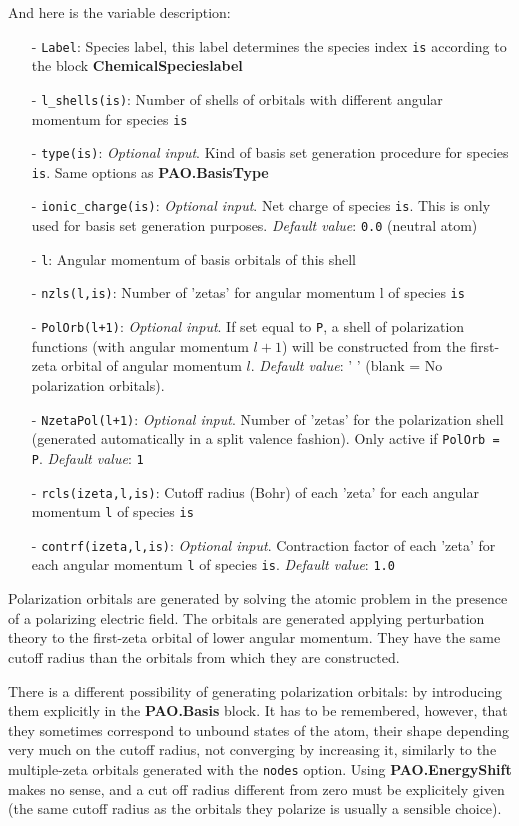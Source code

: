 \begin{description}
\noindent
And here is the variable description:
\begin{itemize}
\item[-] {\tt Label}: Species label, this label determines 
the species index {\tt is} according to the block {\bf ChemicalSpecieslabel}
\item[-] {\tt l\_shells(is)}: Number of shells of orbitals 
with different angular momentum for species {\tt is}  
\item[-] {\tt type(is)}: {\it Optional input}.
Kind of basis set generation procedure for species {\tt is}. 
Same options as {\bf PAO.BasisType}
\item[-] {\tt ionic\_charge(is)}: {\it Optional input}. 
Net charge of species {\tt is}. This is  only used for
basis set generation purposes. {\it Default value}: {\tt 0.0} (neutral atom)
\item[-] {\tt l}: Angular momentum of 
basis orbitals of this shell
\item[-] {\tt nzls(l,is)}: Number of 'zetas' for angular 
momentum l of species {\tt is}
\item[-] {\tt PolOrb(l+1)}: {\it Optional input}. If set equal to {\tt P}, a 
shell of  
polarization functions (with angular momentum $l+1$)  will be constructed 
from the first-zeta orbital of angular momentum $l$. {\it Default value}: ' ' 
(blank = No polarization orbitals). 
\item[-] {\tt NzetaPol(l+1)}: {\it Optional input}. Number of
'zetas' for the 
polarization shell (generated automatically in a split valence fashion). 
Only active if {\tt PolOrb = P}. {\it Default value}: {\tt 1} 
\item[-] {\tt rcls(izeta,l,is)}: Cutoff radius (Bohr) of 
each 'zeta' for each angular momentum {\tt l} of species {\tt is}
\item[-] {\tt contrf(izeta,l,is)}: {\it Optional input}. 
Contraction factor of 
each 'zeta' for each angular momentum {\tt l} of species {\tt is}.
{\it Default value}: {\tt 1.0}
\end{itemize} 

Polarization orbitals 
are generated by solving the atomic problem in the presence of a 
polarizing electric field. The orbitals are generated applying perturbation
theory to the first-zeta orbital of lower angular momentum. 
They have the same cutoff radius than the orbitals from which
they are constructed. 

There is a different possibility of generating polarization orbitals:
by introducing them explicitly in the {\bf PAO.Basis} block.
It has to be remembered, however, that they sometimes correspond to 
unbound states of the atom, their shape depending very much on the
cutoff radius, not converging by increasing it, similarly to the
multiple-zeta orbitals generated with the {\tt nodes} option. 
Using {\bf PAO.EnergyShift} makes no sense, and a cut off 
radius different from zero must be explicitely given (the same cutoff radius
as the orbitals they polarize is usually a sensible choice).


\end{description}
